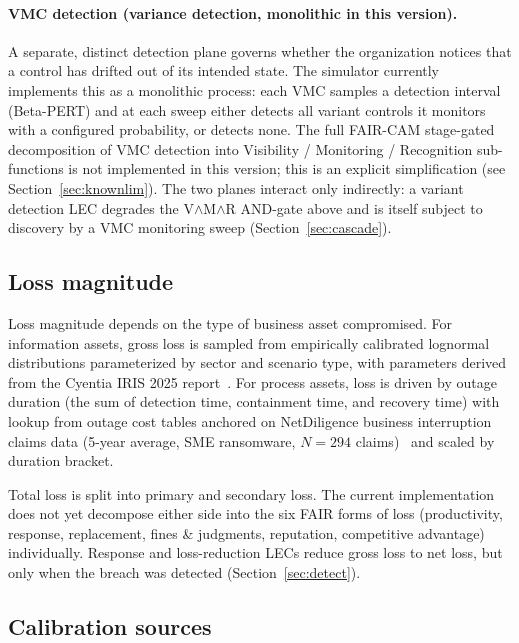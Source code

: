 \documentclass[11pt,a4paper]{article}
\begin{document}
\paragraph{VMC detection (variance detection, monolithic in this version).} A separate, distinct detection plane governs whether the organization notices that a control has drifted out of its intended state. The simulator currently implements this as a monolithic process: each VMC samples a detection interval (Beta-PERT) and at each sweep either detects all variant controls it monitors with a configured probability, or detects none. The full FAIR-CAM stage-gated decomposition of VMC detection into Visibility / Monitoring / Recognition sub-functions is not implemented in this version; this is an explicit simplification (see Section~\ref{sec:knownlim}). The two planes interact only indirectly: a variant detection LEC degrades the V$\wedge$M$\wedge$R AND-gate above and is itself subject to discovery by a VMC monitoring sweep (Section~\ref{sec:cascade}).

\subsection{Loss magnitude}

Loss magnitude depends on the type of business asset compromised. For information assets, gross loss is sampled from empirically calibrated lognormal distributions parameterized by sector and scenario type, with parameters derived from the Cyentia IRIS 2025 report~\citep{IRIS2025}. For process assets, loss is driven by outage duration (the sum of detection time, containment time, and recovery time) with lookup from outage cost tables anchored on NetDiligence business interruption claims data (5-year average, SME ransomware, $N=294$ claims)~\citep{NetDiligence2024} and scaled by duration bracket.

Total loss is split into primary and secondary loss. The current implementation does not yet decompose either side into the six FAIR forms of loss (productivity, response, replacement, fines \& judgments, reputation, competitive advantage) individually. Response and loss-reduction LECs reduce gross loss to net loss, but only when the breach was detected (Section~\ref{sec:detect}).

\subsection{Calibration sources}
\label{sec:dataprovenance}
\end{document}
